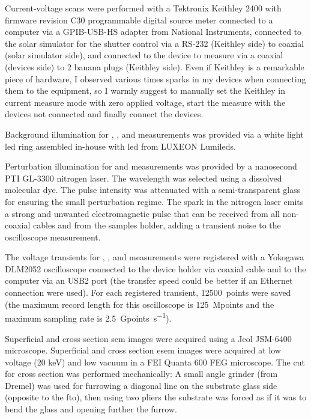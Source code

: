 	 Current-voltage scans were performed with a Tektronix Keithley 2400 with firmware revision C30 programmable digital source meter connected to a computer via a GPIB-USB-HS adapter from National Instruments, connected to the solar simulator for the shutter control via a RS-232 (Keithley side) to coaxial (solar simulator side), and connected to the device to measure via a coaxial (devices side) to 2 banana plugs (Keithley side). Even if Keithley is a remarkable piece of hardware, I observed various times sparks in my devices when connecting them to the equipment, so I warmly suggest to manually set the Keithley in current measure mode with zero applied voltage, start the measure with the devices not connected and finally connect the devices.

	 Background illumination for , , and  measurements was provided via a white light \gls{led} ring assembled in-house with \gls{led} from LUXEON Lumileds.

	 Perturbation illumination for  and  measurements was provided by a nanosecond PTI GL-3300 nitrogen laser. The wavelength was selected using a dissolved molecular dye. The pulse intensity was attenuated with a semi-transparent glass for ensuring the small perturbation regime. The spark in the nitrogen laser emits a strong and unwanted electromagnetic pulse that can be received from all non-coaxial cables and from the samples holder, adding a transient noise to the oscilloscope measurement.

	 The voltage transients for , , and  measurements were registered with a Yokogawa DLM2052 oscilloscope connected to the device holder via coaxial cable and to the computer via an USB2 port (the transfer speed could be better if an Ethernet connection were used). For each registered transient, \SI{12500}{points} were saved (the maximum record length for this oscilloscope is \SI{125}{Mpoints} and the maximum sampling rate is \SI{2.5}{Gpoints\per\s}).

	 Superficial and cross section \gls{sem} images were acquired using a Jeol JSM-6400 microscope. Superficial and cross section \gls{esem} images were acquired at low voltage (20 keV) and low vacuum in a FEI Quanta 600 FEG microscope. The cut for cross section was performed mechanically: A small angle grinder (from Dremel) was used for furrowing a diagonal line on the substrate glass side (opposite to the \gls{fto}), then using two pliers the substrate was forced as if it was to bend the glass and opening further the furrow.

